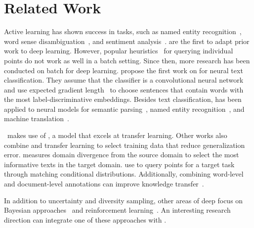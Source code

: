 \section{Related Work}
Active learning has shown success in tasks,
such as named entity recognition~\citep{shen-2004}, word sense
disambiguation~\citep{zhu-2007}, and sentiment analysis~\citep{li-2012}.
\citet{wang-2014} are the first to adapt prior \al{} work to deep learning.
However, popular heuristics~\citep{settles-2009} for querying individual
points do not work as well in a batch setting.
Since then, more research has been conducted on batch \al{} for deep learning.
\citet{zhang-2017} propose the first work on \al{} for neural text
classification.  They assume that the classifier is a convolutional neural
network and use expected gradient length~\citep{settles-2008} to choose
sentences that contain words with the most label-discriminative embeddings.
Besides text classification, \al{} has been applied to neural models for semantic
parsing~\citep{duong-2018}, named entity recognition~\citep{shen-2018}, and
machine translation~\citep{liu-2018}.


\alps~makes use of \bert, a model that excels at transfer learning.  Other
works also combine \al{} and transfer learning to select training data that
reduce generalization error.  \citet{rai-2010} measures
domain divergence from the source domain to select the most informative texts in the target domain.
\citet{xwang-2014} use \al{} to query points for a target task through matching conditional
distributions.  Additionally, combining word-level and document-level
annotations can improve knowledge transfer~\citep{settles-2011,yuan-2020-clime}.

In addition to uncertainty and diversity sampling, other areas of deep \al{} focus on
Bayesian approaches~\citep{siddhant-2018,kirsch-2019} and reinforcement
learning~\citep{fang-2017}.  An interesting research direction can
integrate one of these approaches with \alps{}.

